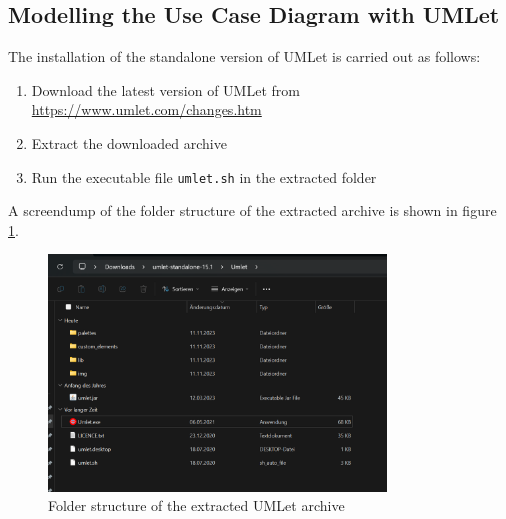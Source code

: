 \subsection{Modelling the Use Case Diagram with UMLet}
The installation of the standalone version of UMLet is carried out as follows:
\begin{enumerate}
    \item Download the latest version of UMLet from \url{https://www.umlet.com/changes.htm}
    \item Extract the downloaded archive
    \item Run the executable file \texttt{umlet.sh} in the extracted folder
\end{enumerate}

A screendump of the folder structure of the extracted archive is shown in figure \ref{fig:umlet_folder_structure}.
\begin{figure}
    \centering
    \includegraphics[width=0.8\textwidth]{figures/goLang/carRental/carRental_umletInstallation.png}
    \caption{Folder structure of the extracted UMLet archive}
    \label{fig:umlet_folder_structure}
\end{figure}
